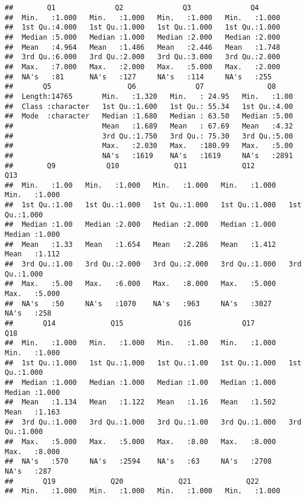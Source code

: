\documentclass[
]{article}
\begin{document}
\begin{verbatim}
##        Q1              Q2              Q3              Q4       
##  Min.   :1.000   Min.   :1.000   Min.   :1.000   Min.   :1.000  
##  1st Qu.:4.000   1st Qu.:1.000   1st Qu.:1.000   1st Qu.:1.000  
##  Median :5.000   Median :1.000   Median :2.000   Median :2.000  
##  Mean   :4.964   Mean   :1.486   Mean   :2.446   Mean   :1.748  
##  3rd Qu.:6.000   3rd Qu.:2.000   3rd Qu.:3.000   3rd Qu.:2.000  
##  Max.   :7.000   Max.   :2.000   Max.   :5.000   Max.   :2.000  
##  NA's   :81      NA's   :127     NA's   :114     NA's   :255    
##       Q5                  Q6              Q7               Q8      
##  Length:14765       Min.   :1.320   Min.   : 24.95   Min.   :1.00  
##  Class :character   1st Qu.:1.600   1st Qu.: 55.34   1st Qu.:4.00  
##  Mode  :character   Median :1.680   Median : 63.50   Median :5.00  
##                     Mean   :1.689   Mean   : 67.69   Mean   :4.32  
##                     3rd Qu.:1.750   3rd Qu.: 75.30   3rd Qu.:5.00  
##                     Max.   :2.030   Max.   :180.99   Max.   :5.00  
##                     NA's   :1619    NA's   :1619     NA's   :2891  
##        Q9            Q10             Q11             Q12             Q13       
##  Min.   :1.00   Min.   :1.000   Min.   :1.000   Min.   :1.000   Min.   :1.000  
##  1st Qu.:1.00   1st Qu.:1.000   1st Qu.:1.000   1st Qu.:1.000   1st Qu.:1.000  
##  Median :1.00   Median :2.000   Median :2.000   Median :1.000   Median :1.000  
##  Mean   :1.33   Mean   :1.654   Mean   :2.286   Mean   :1.412   Mean   :1.112  
##  3rd Qu.:1.00   3rd Qu.:2.000   3rd Qu.:2.000   3rd Qu.:1.000   3rd Qu.:1.000  
##  Max.   :5.00   Max.   :6.000   Max.   :8.000   Max.   :5.000   Max.   :5.000  
##  NA's   :50     NA's   :1070    NA's   :963     NA's   :3027    NA's   :258    
##       Q14             Q15             Q16            Q17             Q18       
##  Min.   :1.000   Min.   :1.000   Min.   :1.00   Min.   :1.000   Min.   :1.000  
##  1st Qu.:1.000   1st Qu.:1.000   1st Qu.:1.00   1st Qu.:1.000   1st Qu.:1.000  
##  Median :1.000   Median :1.000   Median :1.00   Median :1.000   Median :1.000  
##  Mean   :1.134   Mean   :1.122   Mean   :1.16   Mean   :1.502   Mean   :1.163  
##  3rd Qu.:1.000   3rd Qu.:1.000   3rd Qu.:1.00   3rd Qu.:1.000   3rd Qu.:1.000  
##  Max.   :5.000   Max.   :5.000   Max.   :8.00   Max.   :8.000   Max.   :8.000  
##  NA's   :570     NA's   :2594    NA's   :63     NA's   :2708    NA's   :287    
##       Q19             Q20             Q21             Q22       
##  Min.   :1.000   Min.   :1.000   Min.   :1.000   Min.   :1.000  

\end{verbatim}
\end{document}
